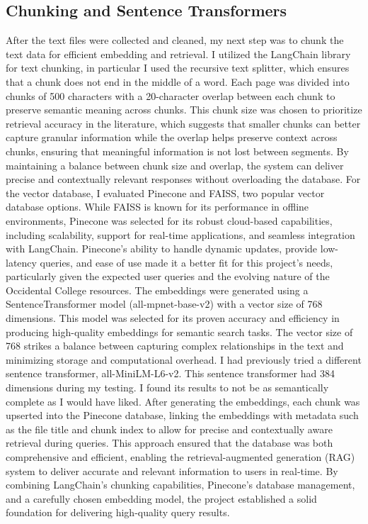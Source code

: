 \documentclass[10pt,twocolumn]{article}
\begin{document}
\subsection{Chunking and Sentence Transformers}
After the text files were collected and cleaned, my next step was to chunk the text data for efficient embedding and retrieval. I utilized the LangChain library for text chunking, in particular I used the recursive text splitter, which ensures that a chunk does not end in the middle of a word. Each page was divided into chunks of 500 characters with a 20-character overlap between each chunk to preserve semantic meaning across chunks. This chunk size was chosen to prioritize retrieval accuracy in the literature, which suggests that smaller chunks can better capture granular information while the overlap helps preserve context across chunks, ensuring that meaningful information is not lost between segments. By maintaining a balance between chunk size and overlap, the system can deliver precise and contextually relevant responses without overloading the database.
\newline
\indent For the vector database, I evaluated Pinecone and FAISS, two popular vector database options. While FAISS is known for its performance in offline environments, Pinecone was selected for its robust cloud-based capabilities, including scalability, support for real-time applications, and seamless integration with LangChain. Pinecone’s ability to handle dynamic updates, provide low-latency queries, and ease of use made it a better fit for this project’s needs, particularly given the expected user queries and the evolving nature of the Occidental College resources.
\newline
\indent The embeddings were generated using a SentenceTransformer model (all-mpnet-base-v2) with a vector size of 768 dimensions. This model was selected for its proven accuracy and efficiency in producing high-quality embeddings for semantic search tasks. The vector size of 768 strikes a balance between capturing complex relationships in the text and minimizing storage and computational overhead. I had previously tried a different sentence transformer, all-MiniLM-L6-v2. This sentence transformer had 384 dimensions during my testing. I found its results to not be as semantically complete as I would have liked. After generating the embeddings, each chunk was upserted into the Pinecone database, linking the embeddings with metadata such as the file title and chunk index to allow for precise and contextually aware retrieval during queries.
This approach ensured that the database was both comprehensive and efficient, enabling the retrieval-augmented generation (RAG) system to deliver accurate and relevant information to users in real-time. By combining LangChain’s chunking capabilities, Pinecone’s database management, and a carefully chosen embedding model, the project established a solid foundation for delivering high-quality query results.
\end{document}
